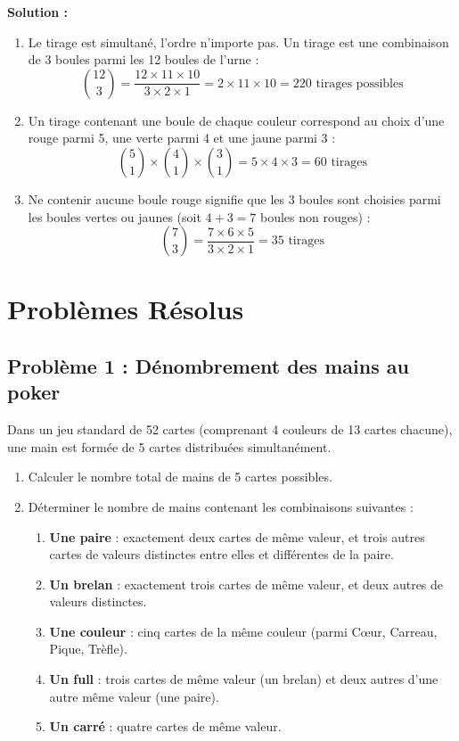 \textbf{Solution :}
\begin{enumerate}
    \item Le tirage est simultané, l'ordre n'importe pas. Un tirage est une combinaison de 3 boules parmi les 12 boules de l'urne :
    \[
    \binom{12}{3} = \frac{12 \times 11 \times 10}{3 \times 2 \times 1} = 2 \times 11 \times 10 = 220 \text{ tirages possibles}
    \]
    
    \item Un tirage contenant une boule de chaque couleur correspond au choix d'une rouge parmi 5, une verte parmi 4 et une jaune parmi 3 :
    \[
    \binom{5}{1} \times \binom{4}{1} \times \binom{3}{1} = 5 \times 4 \times 3 = 60 \text{ tirages}
    \]
    
    \item Ne contenir aucune boule rouge signifie que les 3 boules sont choisies parmi les boules vertes ou jaunes (soit $4 + 3 = 7$ boules non rouges) :
    \[
    \binom{7}{3} = \frac{7 \times 6 \times 5}{3 \times 2 \times 1} = 35 \text{ tirages}
    \]
\end{enumerate}

\section{Problèmes Résolus}

\subsection*{Problème 1 : Dénombrement des mains au poker}
Dans un jeu standard de 52 cartes (comprenant 4 couleurs de 13 cartes chacune), une main est formée de 5 cartes distribuées simultanément.
\begin{enumerate}
    \item Calculer le nombre total de mains de 5 cartes possibles.
    \item Déterminer le nombre de mains contenant les combinaisons suivantes :
    \begin{enumerate}
        \item \textbf{Une paire} : exactement deux cartes de même valeur, et trois autres cartes de valeurs distinctes entre elles et différentes de la paire.
        \item \textbf{Un brelan} : exactement trois cartes de même valeur, et deux autres de valeurs distinctes.
        \item \textbf{Une couleur} : cinq cartes de la même couleur (parmi Cœur, Carreau, Pique, Trèfle).
        \item \textbf{Un full} : trois cartes de même valeur (un brelan) et deux autres d'une autre même valeur (une paire).
        \item \textbf{Un carré} : quatre cartes de même valeur.
    \end{enumerate}
\end{enumerate}

